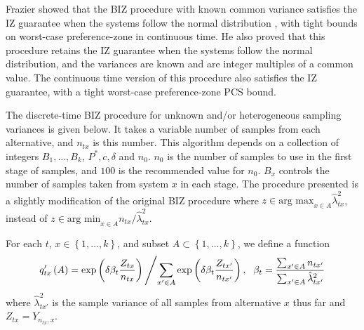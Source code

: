 \documentclass{wscpaperproc}
\newcommand{\lambdahat}{\widehat{\lambda}}
\theoremstyle{wsc}
\begin{document}
Frazier \cite{Frazier:BIZ} showed that the BIZ procedure with known common variance
satisfies the IZ guarantee when the systems follow the normal distribution
, with tight bounds on worst-case preference-zone in continuous time.
He also proved that this procedure retains the IZ guarantee when the
systems follow the normal distribution, and the variances are known
and are integer multiples of a common value. The continuous time version
of this procedure also satisfies the IZ guarantee, with a tight worst-case
preference-zone PCS bound.

The discrete-time BIZ procedure for unknown and/or heterogeneous sampling
variances is given below.  It takes a variable number of samples
from each alternative, and $n_{tx}$ is this number. This algorithm
depends on a collection of integers $B_{1},\ldots,B_{k}$, $P^{*},c,\delta$
and $n_{0}$. $n_{0}$ is the number of samples to use in the first
stage of samples, and $100$ is the recommended value for $n_{0}$.
$B_{x}$ controls the number of samples taken from system $x$ in
each stage. The procedure presented is a slightly modification of the original BIZ 
procedure where $z \in \mbox{arg max}_{x\in A} \lambdahat^2_{tx}$, instead 
of $z \in \mbox{arg min}_{x\in A} n_{tx} / \lambdahat^2_{tx}$.

For each $t$, $x\in\left\{ 1,\ldots,k\right\} $, and subset $A\subset\left\{ 1,\ldots,k\right\} $,
we define a function
\[
q'_{tx}\left(A\right)=\mbox{exp}\left(\delta\beta_{t}\frac{Z_{tx}}{n_{tx}}\right)\left/\sum_{x'\in A}\mbox{exp}\left(\delta\beta_{t}\frac{Z_{tx'}}{n_{tx'}}\right),\right.\mbox{ }\beta_{t}=\frac{\sum_{x'\in A}n_{tx'}}{\sum_{x'\in A}\hat{\lambda}_{tx'}^{2}}
\]
where $\hat{\lambda}_{tx'}^{2}$ is the sample variance of all samples
from alternative $x$ thus far and $Z_{tx}=Y_{n_{tx},x}$.

\vspace{5mm}
   
\end{document}
